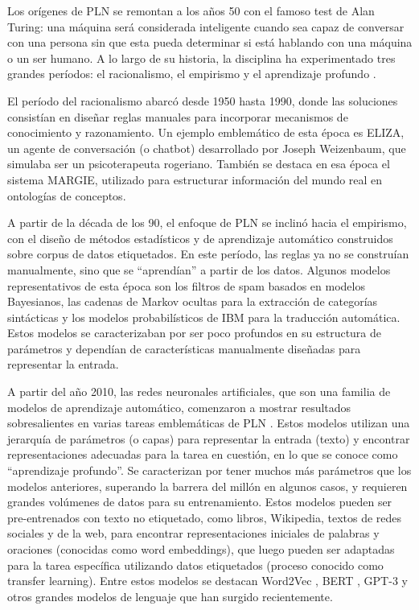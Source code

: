 Los orígenes de PLN se remontan a los años 50 con el famoso test de Alan Turing: una máquina será considerada inteligente cuando sea capaz de conversar con una persona sin que esta pueda determinar si está hablando con una máquina o un ser humano. A lo largo de su historia, la disciplina ha experimentado tres grandes períodos: el racionalismo, el empirismo y el aprendizaje profundo \cite{deng2018deep}.

El período del racionalismo abarcó desde 1950 hasta 1990, donde las soluciones consistían en diseñar reglas manuales para incorporar mecanismos de conocimiento y razonamiento. Un ejemplo emblemático de esta época es ELIZA, un agente de conversación (o chatbot) desarrollado por Joseph Weizenbaum, que simulaba ser un psicoterapeuta rogeriano. También se destaca en esa época el sistema MARGIE, utilizado para estructurar información del mundo real en ontologías de conceptos.

A partir de la década de los 90, el enfoque de PLN se inclinó hacia el empirismo, con el diseño de métodos estadísticos y de aprendizaje automático construidos sobre corpus de datos etiquetados. En este período, las reglas ya no se construían manualmente, sino que se ``aprendían'' a partir de los datos. Algunos modelos representativos de esta época son los filtros de spam basados en modelos Bayesianos, las cadenas de Markov ocultas para la extracción de categorías sintácticas y los modelos probabilísticos de IBM para la traducción automática. Estos modelos se caracterizaban por ser poco profundos en su estructura de parámetros y dependían de características manualmente diseñadas para representar la entrada.

A partir del año 2010, las redes neuronales artificiales, que son una familia de modelos de aprendizaje automático, comenzaron a mostrar resultados sobresalientes en varias tareas emblemáticas de PLN \cite{collobert2011natural}. Estos modelos utilizan una jerarquía de parámetros (o capas) para representar la entrada (texto) y encontrar representaciones adecuadas para la tarea en cuestión, en lo que se conoce como ``aprendizaje profundo''. Se caracterizan por tener muchos más parámetros que los modelos anteriores, superando la barrera del millón en algunos casos, y requieren grandes volúmenes de datos para su entrenamiento. Estos modelos pueden ser pre-entrenados con texto no etiquetado, como libros, Wikipedia, textos de redes sociales y de la web, para encontrar representaciones iniciales de palabras y oraciones (conocidas como word embeddings), que luego pueden ser adaptadas para la tarea específica utilizando datos etiquetados (proceso conocido como transfer learning). Entre estos modelos se destacan Word2Vec \cite{Mikolov2013}, BERT \cite{kenton2019bert}, GPT-3 \cite{brown2020language} y otros grandes modelos de lenguaje que han surgido recientemente.

